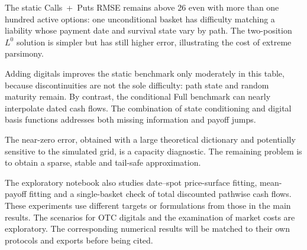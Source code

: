 The static Calls~+~Puts RMSE remains above 26 even with more than one hundred
active options: one unconditional basket has difficulty matching a liability whose
payment date and survival state vary by path. The two-position $L^0$ solution
is simpler but has still higher error, illustrating the cost of extreme
parsimony.

Adding digitals improves the static benchmark only moderately in this table,
because discontinuities are not the sole difficulty: path state and random
maturity remain. By contrast, the conditional Full benchmark can nearly
interpolate dated cash flows. The combination of state conditioning and
digital basis functions addresses both missing information and payoff jumps.

The near-zero error, obtained with a large theoretical dictionary and potentially
sensitive to the simulated grid, is a capacity diagnostic. The remaining problem
is to obtain a sparse, stable and tail-safe approximation.

The exploratory notebook also studies date--spot price-surface fitting, mean-payoff fitting and a single-basket check of total discounted pathwise cash flows. These experiments use different targets or formulations from those in the main results. The scenarios for OTC digitals and the examination of market costs are exploratory. The corresponding numerical results will be matched to their own protocols and exports before being cited.
